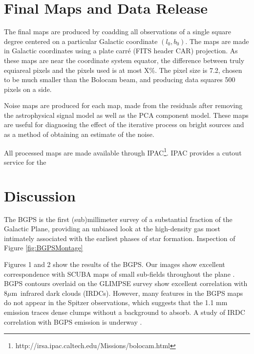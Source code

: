 \documentclass[12pt,preprint]{aastex}
\newcommand{\mum}{\ensuremath{\mu \mathrm{m}}}
\begin{document}
\clearpage 

\section{Final Maps and Data Release}
\label{sec:FinalMaps}

The final maps are produced by coadding all observations of a single
square degree centered on a particular Galactic coordinate
$(l_0,b_0)$.  The maps are made in Galactic coordinates using a plate
carr\'{e} (FITS header CAR) projection.  As these maps are near the
coordinate system equator, the difference between truly equiareal
pixels and the pixels used is at most X\%.  The pixel size is
7.2\arcsec, chosen to be much smaller than the Bolocam beam, and
producing data squares 500 pixels on a side.

Noise maps are produced for each map, made from the residuals after
removing the astrophysical signal model as well as the PCA component
model.  These maps are useful for diagnosing the effect of the
iterative process on bright sources and as a method of obtaining an
estimate of the noise.


All processed maps are made available through
IPAC\footnote{http://irsa.ipac.caltech.edu/Missions/bolocam.html}.
IPAC provides a cutout service for the


\section{Discussion}
\label{sec:Discussion}

The BGPS is the first (sub)millimeter survey of a substantial fraction
of the Galactic Plane, providing an unbiased look at the high-density
gas most intimately associated with the earliest phases of star
formation.  Inspection of Figure \ref{fig:BGPSMontage} 

Figures 1 and 2 show the results of the BGPS.  Our images show
excellent correspondence with SCUBA maps of small sub-fields
throughout the plane \citep{SCUBAlegacy}.  BGPS contours overlaid on
the GLIMPSE survey \citep{benjamin03} show excellent correlation with
8\mum\ infrared dark clouds (IRDCs).  However, many features in the
BGPS maps do not appear in the Spitzer observations, which suggests
that the 1.1 mm emission traces dense clumps without a background to
absorb.  A study of IRDC correlation with BGPS emission is underway
\citep{Battersby2009}.
\end{document}
